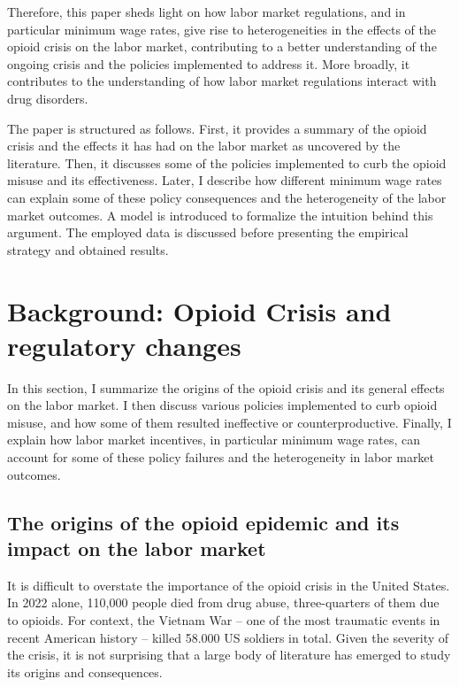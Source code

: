 \documentclass[12pt,a4paper]{article}
\begin{document}
Therefore, this paper sheds light on how labor market regulations, and in particular minimum wage rates, give rise to heterogeneities in the effects of the opioid crisis on the labor market, contributing to a better understanding of the ongoing crisis and the policies implemented to address it.
More broadly, it contributes to the understanding of how labor market regulations interact with drug disorders.

The paper is structured as follows.
First, it provides a summary of the opioid crisis and the effects it has had on the labor market as uncovered by the literature.
Then, it discusses some of the policies implemented to curb the opioid misuse and its effectiveness.
Later, I describe how different minimum wage rates can explain some of these policy consequences and the heterogeneity of the labor market outcomes. 
A model is introduced to formalize the intuition behind this argument.
The employed data is discussed before presenting the empirical strategy and obtained results.


\section*{Background: Opioid Crisis and regulatory changes}

In this section, I summarize the origins of the opioid crisis and its general effects on the labor market.
I then discuss various policies implemented to curb opioid misuse, and how some of them resulted ineffective or counterproductive. 
Finally, I explain how labor market incentives, in particular minimum wage rates, can account for some of these policy failures and the heterogeneity in labor market outcomes.

\subsection*{The origins of the opioid epidemic and its impact on the labor market}

It is difficult to overstate the importance of the opioid crisis in the United States. 
In 2022 alone, 110,000 people died from drug abuse, three-quarters of them due to opioids.
For context, the Vietnam War -- one of the most traumatic events in recent American history -- killed 58.000 US soldiers in total.
Given the severity of the crisis, it is not surprising that a large body of literature has emerged to study its origins and consequences.
\end{document}
